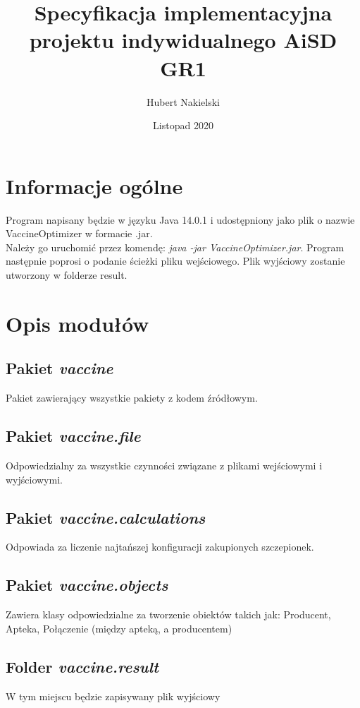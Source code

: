 \documentclass[]{article}
\title{Specyfikacja implementacyjna projektu indywidualnego \textbf{AiSD GR1}}
\author{Hubert Nakielski}
\date{Listopad 2020}
\begin{document}
    \maketitle


    \section{Informacje ogólne}
    Program napisany będzie w języku Java 14.0.1 i udostępniony jako plik o nazwie VaccineOptimizer w formacie .jar.\\
    Należy go uruchomić przez komendę: \textit{java -jar VaccineOptimizer.jar}.
    Program następnie poprosi o podanie ścieżki pliku wejściowego. Plik wyjściowy zostanie utworzony w folderze result.


    \section{Opis modułów}

    \subsection{Pakiet \textit{vaccine}}
    Pakiet zawierający wszystkie pakiety z kodem źródłowym.

    \subsection{Pakiet \textit{vaccine.file}}
    Odpowiedzialny za wszystkie czynności związane z plikami wejściowymi i wyjściowymi.

    \subsection{Pakiet \textit{vaccine.calculations}}
    Odpowiada za liczenie najtańszej konfiguracji zakupionych szczepionek.

    \subsection{Pakiet \textit{vaccine.objects}}
    Zawiera klasy odpowiedzialne za tworzenie obiektów takich jak: Producent, Apteka, Połączenie (między apteką, a producentem)

    \subsection{Folder \textit{vaccine.result}}
    W tym miejscu będzie zapisywany plik wyjściowy
\end{document}
